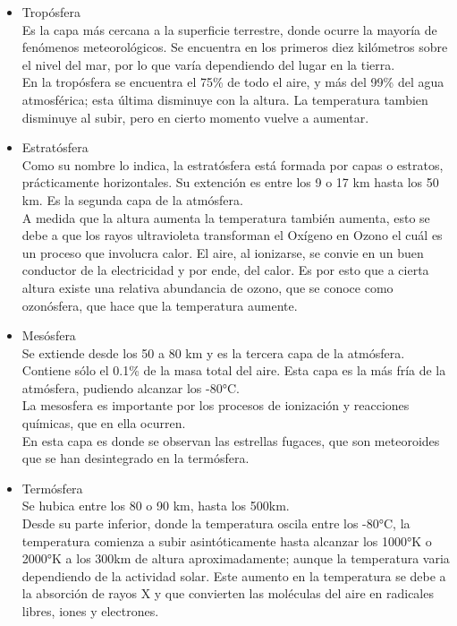 \documentclass[a4paper]{article}
\begin{document}
\begin{itemize}
\item Tropósfera \\
Es la capa más cercana a la superficie terrestre, donde ocurre la mayoría de fenómenos meteorológicos. Se encuentra en los primeros diez kilómetros sobre el nivel del mar, por lo que varía dependiendo del lugar en la tierra. \\ En la tropósfera se encuentra el 75\% de todo el aire, y más del 99\% del agua atmosférica; esta última disminuye con la altura. La temperatura tambien disminuye al subir, pero en cierto momento vuelve a aumentar. \\

\item Estratósfera \\
Como su nombre lo indica, la estratósfera está formada por capas o estratos, prácticamente horizontales. Su extención es entre los 9 o 17 km hasta los 50 km. Es la segunda capa de la atmósfera. \\ A medida que la altura aumenta la temperatura también aumenta, esto se debe a que los rayos ultravioleta transforman el Oxígeno en Ozono el cuál es un proceso que involucra calor. El aire, al ionizarse, se convie en un buen conductor de la electricidad y por ende, del calor. Es por esto que a cierta altura existe una relativa abundancia de ozono, que se conoce como ozonósfera, que hace que la temperatura aumente. \\

\item Mesósfera \\ Se extiende desde los 50 a 80 km y es la tercera capa de la atmósfera. Contiene sólo el 0.1\%
de la masa total del aire. Esta capa es la más fría de la atmósfera, pudiendo alcanzar los -80°C. \\
La mesosfera es importante por los procesos de ionización y reacciones químicas, que en ella ocurren. \\ En esta capa 
es donde se observan las estrellas fugaces, que son meteoroides que se han desintegrado en la termósfera. \\
\item Termósfera \\
Se hubica entre los 80 o 90 km, hasta los 500km. \\ Desde su parte inferior, donde la temperatura oscila entre los -80°C, la temperatura comienza a subir asintóticamente hasta alcanzar los 1000°K o 2000°K a los 300km de altura aproximadamente; aunque la temperatura varia dependiendo de la actividad solar. Este aumento en la temperatura se debe a la absorción de rayos X y que convierten las moléculas del aire en radicales libres, iones y electrones. \\


\end{itemize}
\end{document}
